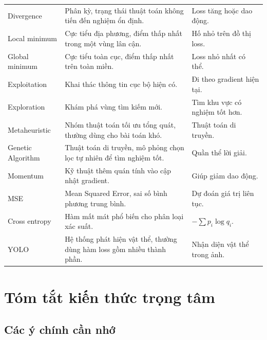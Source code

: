 \documentclass[12pt,a4paper]{report}
\begin{document}
\begin{longtable}{p{}p{}p{}}
Divergence & Phân kỳ, trạng thái thuật toán không tiến đến nghiệm ổn định. & Loss tăng hoặc dao động. \\

Local minimum & Cực tiểu địa phương, điểm thấp nhất trong một vùng lân cận. & Hố nhỏ trên đồ thị loss. \\

Global minimum & Cực tiểu toàn cục, điểm thấp nhất trên toàn miền. & Loss nhỏ nhất có thể. \\

Exploitation & Khai thác thông tin cục bộ hiện có. & Đi theo gradient hiện tại. \\

Exploration & Khám phá vùng tìm kiếm mới. & Tìm khu vực có nghiệm tốt hơn. \\

Metaheuristic & Nhóm thuật toán tối ưu tổng quát, thường dùng cho bài toán khó. & Thuật toán di truyền. \\

Genetic Algorithm & Thuật toán di truyền, mô phỏng chọn lọc tự nhiên để tìm nghiệm tốt. & Quần thể lời giải. \\

Momentum & Kỹ thuật thêm quán tính vào cập nhật gradient. & Giúp giảm dao động. \\

MSE & Mean Squared Error, sai số bình phương trung bình. & Dự đoán giá trị liên tục. \\

Cross entropy & Hàm mất mát phổ biến cho phân loại xác suất. & $-\sum p_i\log q_i$. \\

YOLO & Hệ thống phát hiện vật thể, thường dùng hàm loss gồm nhiều thành phần. & Nhận diện vật thể trong ảnh. \\

\bottomrule
\end{longtable}
\normalsize

\chapter{Tóm tắt kiến thức trọng tâm}

\section{Các ý chính cần nhớ}
\end{document}
